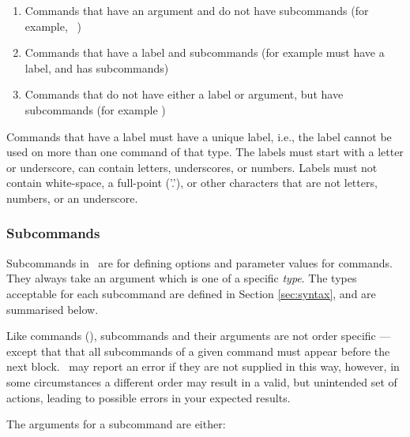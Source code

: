 \begin{enumerate}
\item Commands that have an argument and do not have subcommands (for example, \ )
\item Commands that have a label and subcommands (for example  must have a label, and has subcommands)
\item Commands that do not have either a label or argument, but have subcommands (for example )
\end{enumerate}

Commands that have a label must have a unique label, i.e., the label cannot be used on more than one command of that type. The labels must start with a letter or underscore, can contain letters, underscores, or numbers. Labels must not contain white-space, a full-point ('.'), or other characters that are not letters, numbers, or an underscore.
\EX \EXend

\subsubsection{Subcommands}
\CH
Subcommands in \iSAM\ are for defining options and parameter values for commands. They always take an argument which is one of a specific \emph{type}. The types acceptable for each subcommand are defined in Section \ref{sec:syntax}, and are summarised below. 

Like commands (), subcommands and their arguments are not order specific --- except that that all subcommands of a given command must appear before the next  block. \iSAM\ may report an error if they are not supplied in this way, however, in some circumstances a different order may result in a valid, but unintended set of actions, leading to possible errors in your expected results.  

The arguments for a subcommand are either:

